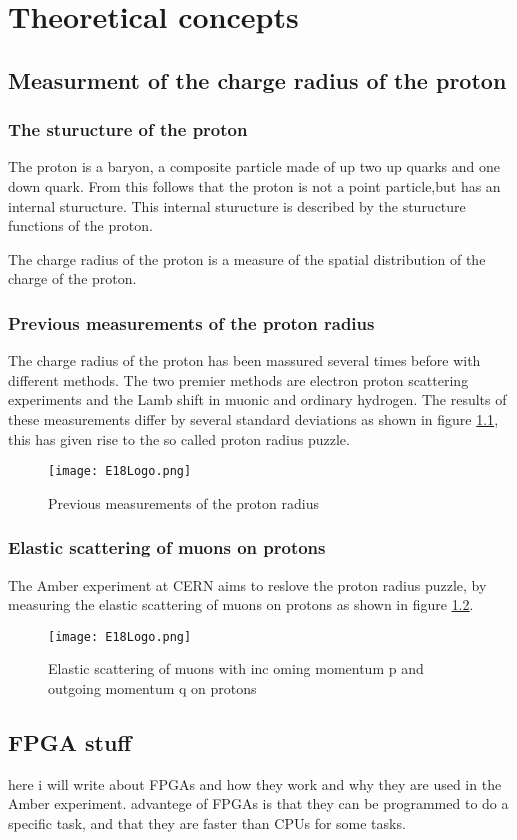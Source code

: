 \chapter{Theoretical concepts}\label{cha:theory}

\section{Measurment of the charge radius of the proton}\label{sec:proton_radius}

\subsection{The sturucture of the proton}
The proton is a baryon, a composite particle made of up two up quarks and one down quark.
From this follows that the proton is not a point particle,but has an internal sturucture.
This internal sturucture is described by the sturucture functions of the proton.

The charge radius of the proton is a measure of the spatial distribution of the charge of the proton.

\subsection{Previous measurements of the proton radius}
The charge radius of the proton has been massured several times before with different methods.
The two premier methods are electron proton scattering experiments and the Lamb shift in muonic and ordinary hydrogen.
The results of these measurements differ by several standard deviations as shown in figure \ref{fig:previous_proton_radius},
this has given rise to the so called proton radius puzzle.
\begin{figure}[H]
	\centering
	\texttt{[image: E18Logo.png]}
	\caption{Previous measurements of the proton radius}
	\label{fig:previous_proton_radius}
\end{figure}



\subsection{Elastic scattering of muons on protons}
The Amber experiment at CERN aims to reslove the proton radius puzzle, by measuring the elastic scattering of muons on protons as shown in figure \ref{fig:muon_proton_scatterin}.
\begin{figure}[h]
	\centering
	\texttt{[image: E18Logo.png]}
	\caption{Elastic scattering of muons with inc oming momentum p and outgoing momentum q on protons}
	\label{fig:muon_proton_scatterin}
\end{figure}

\newpage


\section{FPGA stuff}\label{sec:FPGAstuff}
here i will write about FPGAs and how they work and why they are used in the Amber experiment.
advantege of FPGAs is that they can be programmed to do a specific task, and that they are faster than CPUs for some tasks.